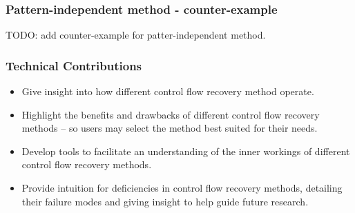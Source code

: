 \documentclass[aspectratio=1610]{beamer}
\begin{document}
\begin{frame}
	\frametitle{Pattern-independent method - counter-example}

	TODO: add counter-example for patter-independent method.
\end{frame}


\begin{frame}
	\frametitle{Technical Contributions}

	\begin{itemize}
		\item Give insight into how different control flow recovery method operate.
		\item Highlight the benefits and drawbacks of different control flow recovery methods -- so users may select the method best suited for their needs.
		\item Develop tools to facilitate an understanding of the inner workings of different control flow recovery methods.
		\item Provide intuition for deficiencies in control flow recovery methods, detailing their failure modes and giving insight to help guide future research.
	\end{itemize}


\end{frame}

\end{document}
